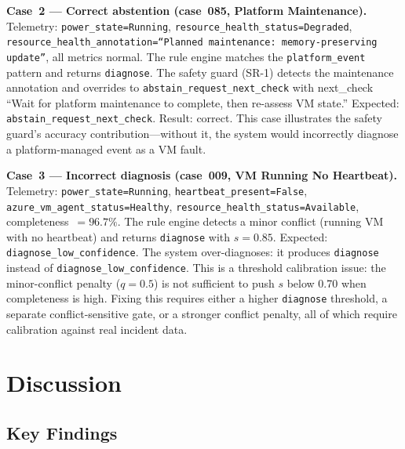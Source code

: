 \documentclass[a4paper,10pt,journal,compsoc]{IEEEtran}
\begin{document}
\textbf{Case~2 --- Correct abstention (case~085, Platform
Maintenance).}
Telemetry: \texttt{power\_state=Running},
\texttt{resource\_health\_status=Degraded},
\texttt{resource\_health\_annotation=``Planned maintenance:
memory-preserving update''}, all metrics normal. The rule engine
matches the \texttt{platform\_event} pattern and returns
\texttt{diagnose}. The safety guard (SR-1) detects the maintenance
annotation and overrides to \texttt{abstain\_request\_next\_check}
with next\_check ``Wait for platform maintenance to complete, then
re-assess VM state.'' Expected: \texttt{abstain\_request\_next\_check}.
Result: correct. This case illustrates the safety guard's accuracy
contribution---without it, the system would incorrectly diagnose a
platform-managed event as a VM fault.

\textbf{Case~3 --- Incorrect diagnosis (case~009, VM Running No
Heartbeat).}
Telemetry: \texttt{power\_state=Running},
\texttt{heartbeat\_present=False},
\texttt{azure\_vm\_agent\_status=Healthy},
\texttt{resource\_health\_status=Available}, completeness~$= 96.7\%$.
The rule engine detects a minor conflict (running VM with no
heartbeat) and returns \texttt{diagnose} with $s = 0.85$. Expected:
\texttt{diagnose\_low\_confidence}. The system over-diagnoses: it
produces \texttt{diagnose} instead of \texttt{diagnose\_low\_confidence}.
This is a threshold calibration issue: the minor-conflict penalty
($q = 0.5$) is not sufficient to push $s$ below 0.70 when
completeness is high. Fixing this requires either a higher
\texttt{diagnose} threshold, a separate conflict-sensitive gate, or a
stronger conflict penalty, all of which require calibration against
real incident data.

\section{Discussion}

\subsection{Key Findings}
\end{document}
